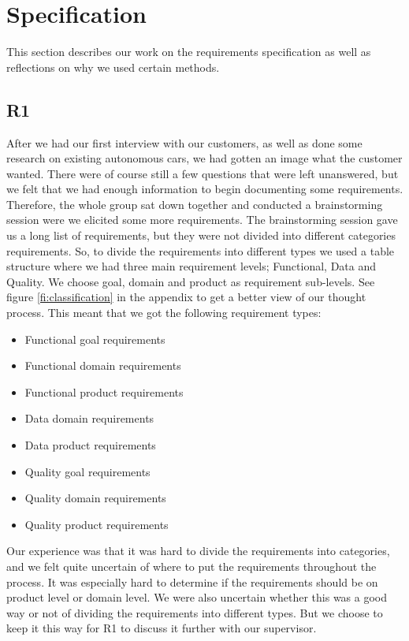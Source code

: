 \documentclass[10pt]{article}
\begin{document}
\section{Specification}
This section describes our work on the requirements specification as well as reflections on why we used certain methods. 

\subsection{R1}
After we had our first interview with our customers, as well as done some research on existing autonomous cars, we had gotten an image what the customer wanted. There were of course still a few questions that were left unanswered, but we felt that we had enough information to begin documenting some requirements. Therefore, the whole group sat down together and conducted a brainstorming session were we elicited some more requirements. The brainstorming session gave us a long list of requirements, but they were not divided into different categories requirements. So, to divide the requirements into different types we used a table structure where we had three main requirement levels; Functional, Data and Quality. We choose goal, domain and product as requirement sub-levels. See figure \ref{fi:classification} in the appendix to get a better view of our thought process. This meant that we got the following requirement types:  
\begin{itemize}
\item Functional goal requirements
\item Functional domain requirements
\item Functional product requirements
\item Data domain requirements
\item Data product requirements
\item Quality goal requirements
\item Quality domain requirements
\item Quality product requirements
\end{itemize}
Our experience was that it was hard to divide the requirements into categories, and we felt quite uncertain of where to put the requirements throughout the process. It was especially hard to determine if the requirements should be on product level or domain level. We were also uncertain whether this was a good way or not of dividing the requirements into different types. But we choose to keep it this way for R1 to discuss it further with our supervisor. 
\end{document}
